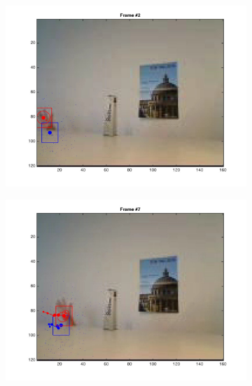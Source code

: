 \documentclass{ethz_report}
\begin{document}
\begin{figure}[H]
    \centering
    \begin{subfigure}[b]{.25\textwidth}
        \centering
        \includegraphics[width=1\linewidth]{images/video2_model_1}
    \end{subfigure}%
    \begin{subfigure}[b]{.25\textwidth}
        \centering
        \includegraphics[width=1\linewidth]{images/video2_model_6}
    \end{subfigure}%
    \begin{subfigure}[b]{.25\textwidth}
        \centering

\end{subfigure}
\end{figure}
\end{document}
